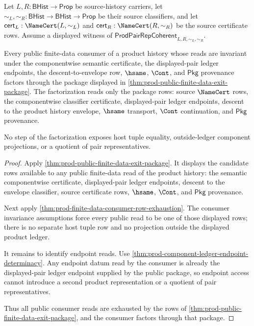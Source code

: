 \begin{theorem}
\label{thm:prod-finite-data-public-exit-consumer-universality}
Let $L,R:\mathsf{BHist}\to\mathsf{Prop}$ be source-history carriers, let
$\sim_L,\sim_R:\mathsf{BHist}\to\mathsf{BHist}\to\mathsf{Prop}$ be their
source classifiers, and let
$\mathsf{cert}_L:\NameCert(L,\sim_L)$ and
$\mathsf{cert}_R:\NameCert(R,\sim_R)$ be the source certificate rows. Assume a
displayed witness of
$\mathsf{ProdPairRepCoherent}_{L,R,\sim_L,\sim_R}$.

Every public finite-data consumer of a product history whose reads are
invariant under the componentwise semantic certificate, the displayed-pair
ledger endpoints, the descent-to-envelope row, $\hsame$, $\Cont$, and
$\mathsf{Pkg}$ provenance factors through the package displayed in
\autoref{thm:prod-public-finite-data-exit-package}. The factorization reads
only the package rows: source $\NameCert$ rows, the componentwise classifier
certificate, displayed-pair ledger endpoints, descent to the product history
envelope, $\hsame$ transport, $\Cont$ continuation, and $\mathsf{Pkg}$
provenance.

No step of the factorization exposes host tuple equality, outside-ledger
component projections, or a quotient of pair representatives.
\end{theorem}
\begin{proof}
Apply \autoref{thm:prod-public-finite-data-exit-package}. It displays the
candidate rows available to any public finite-data read of the product
history: the semantic componentwise certificate, displayed-pair ledger
endpoints, descent to the envelope classifier, source certificate rows,
$\hsame$, $\Cont$, and $\mathsf{Pkg}$ provenance.

Next apply \autoref{thm:prod-finite-data-consumer-row-exhaustion}. The
consumer invariance assumptions force every public read to be one of those
displayed rows; there is no separate host tuple row and no projection outside
the displayed product ledger.

It remains to identify endpoint reads. Use
\autoref{thm:prod-component-ledger-endpoint-determinacy}. Any endpoint datum
read by the consumer is already the displayed-pair ledger endpoint supplied by
the public package, so endpoint access cannot introduce a second product
representation or a quotient of pair representatives.

Thus all public consumer reads are exhausted by the rows of
\autoref{thm:prod-public-finite-data-exit-package}, and the consumer factors
through that package.
\end{proof}

